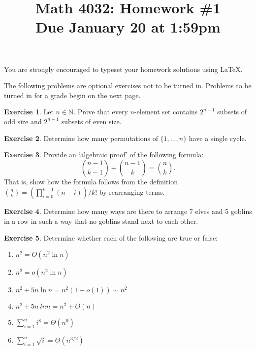 \documentclass[11pt, letter]{amsart}
\title[Math 4032: Homework \#1\qquad Due January 20 at 1:59pm]{Math 4032: Homework \#1\\
  Due January 20 at 1:59pm}
\theoremstyle{definition}
\newtheorem{exercise}{Exercise}[]
\begin{document}
\maketitle


\begin{center}
  You are strongly encouraged to typeset your homework solutions using \LaTeX.
\end{center}

The following problems are optional exercises not to be turned in.  Problems to be turned in for a grade begin on the next page.  

\begin{exercise}
  Let $n \in \mathbb N$.  Prove that every $n$-element set contains $2^{n - 1}$ subsets of odd size and $2^{n - 1}$ subsets of even size.
\end{exercise}
\begin{exercise}
  Determine how many permutations of $\{1, \dots, n\}$ have a single cycle.
\end{exercise}

\begin{exercise}
  Provide an `algebraic proof' of the following formula:
  \begin{equation*}
    \binom{n - 1}{k - 1} + \binom{n - 1}{k} = \binom{n}{k}.
  \end{equation*}
  That is, show how the formula follows from the definition $\binom{n}{k} = \left(\prod_{i=0}^{k - 1}(n - i)\right) / k!$ by rearranging terms.
\end{exercise}

\begin{exercise}
  Determine how many ways are there to arrange 7 elves and 5 goblins in a row in such a way that no goblins stand next to each other.
\end{exercise}

\begin{exercise}
  Determine whether each of the following are true or false:
  \begin{enumerate}[label=(\alph*)]
  \item $n^2 = O(n^2 \ln n)$
  \item $n^2 = o(n^2 \ln n)$
  \item $n^2 + 5n\ln n = n^2(1 + o(1)) \sim n^2$
  \item $n^2 + 5n\ ln n = n^2 + O(n)$
  \item $\sum_{i=1}^n i^8 = \Theta(n^9)$
  \item $\sum_{i=1}^n \sqrt i = \Theta(n^{3/2})$
  \end{enumerate}
\end{exercise}
\end{document}
